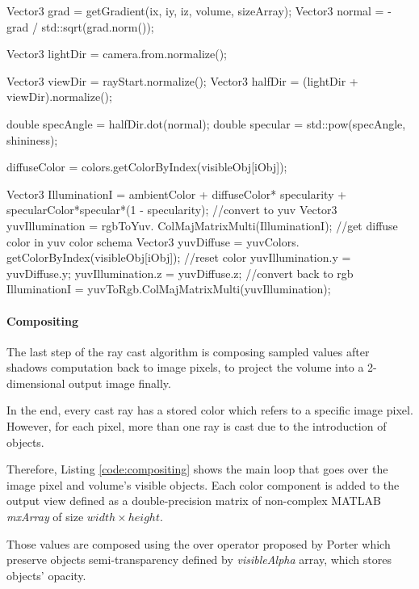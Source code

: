 \documentclass[12pt,a4paper]{extarticle}
\newcommand{\linespace}{\vspace{8pt}}
\begin{document}
\begin{cpp}[caption={Blinn-Phong reflection computation using voxel's gradient as surface normal and colors in YUV space to preserve selected input color but not luminosity},label=code:shadowing]
Vector3 grad = getGradient(ix, iy, iz, volume, sizeArray);
Vector3 normal = -grad / std::sqrt(grad.norm());

Vector3 lightDir = camera.from.normalize();

Vector3 viewDir = rayStart.normalize();
Vector3 halfDir = (lightDir + viewDir).normalize();

double specAngle = halfDir.dot(normal);
double specular = std::pow(specAngle, shininess);

diffuseColor = colors.getColorByIndex(visibleObj[iObj]);

Vector3 IlluminationI = ambientColor + diffuseColor* 
specularity + specularColor*specular*(1 - specularity);
//convert to yuv
Vector3 yuvIllumination = rgbToYuv.
		ColMajMatrixMulti(IlluminationI);
//get diffuse color in yuv color schema
Vector3 yuvDiffuse = yuvColors.
		getColorByIndex(visibleObj[iObj]);
//reset color
yuvIllumination.y = yuvDiffuse.y;
yuvIllumination.z = yuvDiffuse.z;
//convert back to rgb
IlluminationI = yuvToRgb.ColMajMatrixMulti(yuvIllumination);
\end{cpp}

\paragraph{Compositing} The last step of the ray cast algorithm is composing sampled values after shadows computation back to image pixels, to project the volume into a 2-dimensional output image finally.

In the end, every cast ray has a stored color which refers to a specific image pixel. However, for each pixel, more than one ray is cast due to the introduction of objects.
\linespace

Therefore, Listing \ref{code:compositing} shows the main loop that goes over the image pixel and volume's visible objects. Each color component is added to the output view defined as a double-precision matrix of non-complex MATLAB \textit{mxArray} of size $width\times height$. 

Those values are composed using the over operator proposed by Porter which preserve objects semi-transparency defined by \textit{visibleAlpha} array, which stores objects' opacity. 
\end{document}
